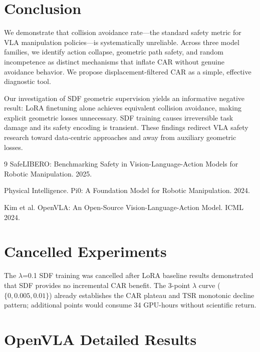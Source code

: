 \documentclass[letterpaper]{article}
\begin{document}
\section{Conclusion}
\label{sec:conclusion}

We demonstrate that collision avoidance rate---the standard safety metric for VLA manipulation policies---is systematically unreliable. Across three model families, we identify action collapse, geometric path safety, and random incompetence as distinct mechanisms that inflate CAR without genuine avoidance behavior. We propose displacement-filtered CAR as a simple, effective diagnostic tool.

Our investigation of SDF geometric supervision yields an informative negative result: LoRA finetuning alone achieves equivalent collision avoidance, making explicit geometric losses unnecessary. SDF training causes irreversible task damage and its safety encoding is transient. These findings redirect VLA safety research toward data-centric approaches and away from auxiliary geometric losses.

{\small

\begin{thebibliography}{9}
SafeLIBERO: Benchmarking Safety in Vision-Language-Action Models for Robotic Manipulation. 2025.

Physical Intelligence. Pi0: A Foundation Model for Robotic Manipulation. 2024.

Kim et al. OpenVLA: An Open-Source Vision-Language-Action Model. ICML 2024.
\end{thebibliography}
}

\appendix
\section{Cancelled Experiments}
\label{app:cancelled}

The $\lambda$=0.1 SDF training was cancelled after LoRA baseline results demonstrated that SDF provides no incremental CAR benefit. The 3-point $\lambda$ curve ($\{0, 0.005, 0.01\}$) already establishes the CAR plateau and TSR monotonic decline pattern; additional points would consume 34 GPU-hours without scientific return.

\section{OpenVLA Detailed Results}
\label{app:openvla}
\end{document}
